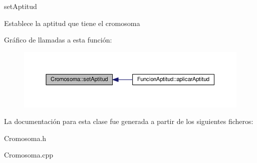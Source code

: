 set\-Aptitud 

Establece la aptitud que tiene el cromosoma 

Gráfico de llamadas a esta función\-:\nopagebreak
\begin{figure}[H]
\begin{center}
\leavevmode
\includegraphics[width=350pt]{classCromosoma_a158f2fe672e3232ebf07a5724a15fc2e_icgraph}
\end{center}
\end{figure}




La documentación para esta clase fue generada a partir de los siguientes ficheros\-:\begin{DoxyCompactItemize}
\item 
Cromosoma.\-h\item 
Cromosoma.\-cpp\end{DoxyCompactItemize}
